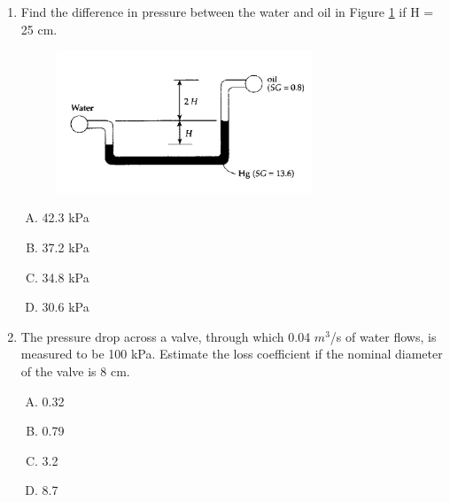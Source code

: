\documentclass[12pt]{article}
\begin{document}
\begin{enumerate}



\item Find the difference in pressure between the water and oil in Figure \ref{fig:manometer} if H = 25 cm. 

\begin{figure}[htbp] %
   \centering
   \includegraphics[width=3in]{manometer.png} 
   \caption{}
   \label{fig:manometer}
\end{figure}

\begin{enumerate}[A)]
\item 42.3 kPa
\item 37.2 kPa
\item 34.8 kPa
\item 30.6 kPa
\end{enumerate}

\clearpage

\item The pressure drop across a valve, through which 0.04 $m^3$/s of water flows, is measured to be 100 kPa. Estimate the loss coefficient if the nominal diameter of the valve is 8 cm.
\begin{enumerate}[A)]
\item 0.32
\item 0.79
\item 3.2
\item 8.7
\end{enumerate}


\end{enumerate}
\end{document}
